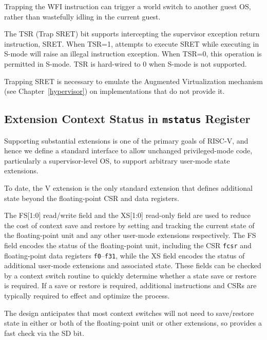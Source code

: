 \begin{commentary}
Trapping the WFI
instruction can trigger a world switch to another guest OS, rather than
wastefully idling in the current guest.
\end{commentary}

The TSR (Trap SRET) bit supports intercepting the supervisor exception return
instruction, SRET.  When TSR=1, attempts to execute SRET while executing in
S-mode will raise an illegal instruction exception.  When TSR=0, this
operation is permitted in S-mode.  TSR is hard-wired to 0 when S-mode is not
supported.

\begin{commentary}
Trapping SRET is necessary to emulate the Augmented Virtualization mechanism
(see Chapter~\ref{hypervisor}) on implementations that do not provide it.
\end{commentary}

\subsection{Extension Context Status in {\tt mstatus} Register}

Supporting substantial extensions is one of the primary goals of
RISC-V, and hence we define a standard interface to allow unchanged
privileged-mode code, particularly a supervisor-level OS, to support
arbitrary user-mode state extensions.

\begin{commentary}
  To date, the V extension is the only standard extension that defines
  additional state beyond the floating-point CSR and data registers.
\end{commentary}

The FS[1:0] read/write field and the XS[1:0] read-only field are used
to reduce the cost of context save and restore by setting and tracking
the current state of the floating-point unit and any other user-mode
extensions respectively.  The FS field encodes the status of the
floating-point unit, including the CSR {\tt fcsr} and floating-point
data registers {\tt f0}--{\tt f31}, while the XS field encodes the
status of additional user-mode extensions and associated state.
These fields can be checked by a context switch routine to quickly
determine whether a state save or restore is required.  If a save or
restore is required, additional instructions and CSRs are typically
required to effect and optimize the process.

\begin{commentary}
  The design anticipates that most context switches will not need to
  save/restore state in either or both of the floating-point unit or
  other extensions, so provides a fast check via the SD bit.
\end{commentary}


